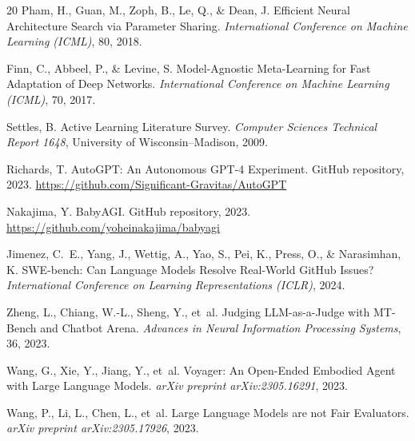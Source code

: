 \documentclass[11pt]{article}
\begin{document}
\begin{thebibliography}{20}
Pham, H., Guan, M., Zoph, B., Le, Q., \& Dean, J.
\newblock Efficient Neural Architecture Search via Parameter Sharing.
\newblock \emph{International Conference on Machine Learning (ICML)}, 80, 2018.

Finn, C., Abbeel, P., \& Levine, S.
\newblock Model-Agnostic Meta-Learning for Fast Adaptation of Deep Networks.
\newblock \emph{International Conference on Machine Learning (ICML)}, 70, 2017.

Settles, B.
\newblock Active Learning Literature Survey.
\newblock \emph{Computer Sciences Technical Report 1648}, University of Wisconsin--Madison, 2009.

Richards, T.
\newblock AutoGPT: An Autonomous GPT-4 Experiment.
\newblock GitHub repository, 2023.
\newblock \url{https://github.com/Significant-Gravitas/AutoGPT}

Nakajima, Y.
\newblock BabyAGI.
\newblock GitHub repository, 2023.
\newblock \url{https://github.com/yoheinakajima/babyagi}

Jimenez, C.~E., Yang, J., Wettig, A., Yao, S., Pei, K., Press, O., \& Narasimhan, K.
\newblock SWE-bench: Can Language Models Resolve Real-World GitHub Issues?
\newblock \emph{International Conference on Learning Representations (ICLR)}, 2024.

Zheng, L., Chiang, W.-L., Sheng, Y., et~al.
\newblock Judging LLM-as-a-Judge with MT-Bench and Chatbot Arena.
\newblock \emph{Advances in Neural Information Processing Systems}, 36, 2023.

Wang, G., Xie, Y., Jiang, Y., et~al.
\newblock Voyager: An Open-Ended Embodied Agent with Large Language Models.
\newblock \emph{arXiv preprint arXiv:2305.16291}, 2023.

Wang, P., Li, L., Chen, L., et~al.
\newblock Large Language Models are not Fair Evaluators.
\newblock \emph{arXiv preprint arXiv:2305.17926}, 2023.

\end{thebibliography}
\end{document}
